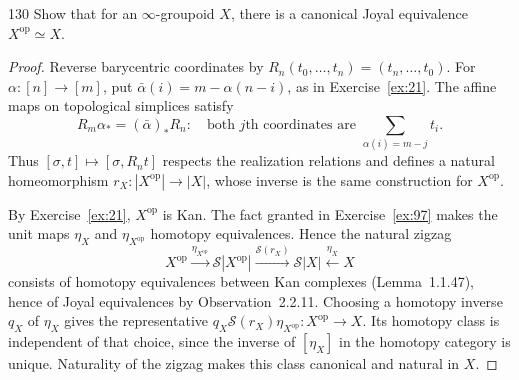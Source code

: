 \begin{exercise}{130}
Show that for an $\infty$-groupoid $X$, there is a canonical Joyal equivalence
$X^{\mathrm{op}}\simeq X$.

\begin{proof}
Reverse barycentric coordinates by
$R_n(t_0,\ldots,t_n)=(t_n,\ldots,t_0)$.
For $\alpha\colon[n]\to[m]$, put
$\bar\alpha(i)=m-\alpha(n-i)$, as in Exercise~\ref{ex:21}.
The affine maps on topological simplices satisfy
\[
 R_m\alpha_*=(\bar\alpha)_*R_n:
 \quad\text{both $j$th coordinates are }
 \sum_{\alpha(i)=m-j}t_i.
\]
Thus $[\sigma,t]\mapsto[\sigma,R_nt]$ respects the realization relations
and defines a natural homeomorphism
$r_X\colon|X^{\mathrm{op}}|\to|X|$, whose inverse is the same construction
for $X^{\mathrm{op}}$.

By Exercise~\ref{ex:21}, $X^{\mathrm{op}}$ is Kan.
The fact granted in Exercise~\ref{ex:97} makes the unit maps
$\eta_X$ and $\eta_{X^{\mathrm{op}}}$ homotopy equivalences.
Hence the natural zigzag
\[
 X^{\mathrm{op}}\xrightarrow{\eta_{X^{\mathrm{op}}}}
 \mathcal S|X^{\mathrm{op}}|
 \xrightarrow{\mathcal S(r_X)}\mathcal S|X|
 \xleftarrow{\eta_X}X
\]
consists of homotopy equivalences between Kan complexes
(Lemma~1.1.47), hence of Joyal equivalences by Observation~2.2.11.
Choosing a homotopy inverse $q_X$ of $\eta_X$ gives the representative
$q_X\mathcal S(r_X)\eta_{X^{\mathrm{op}}}\colon X^{\mathrm{op}}\to X$.
Its homotopy class is independent of that choice, since the inverse of
$[\eta_X]$ in the homotopy category is unique.
Naturality of the zigzag makes this class canonical and natural in $X$.
\end{proof}
\end{exercise}
